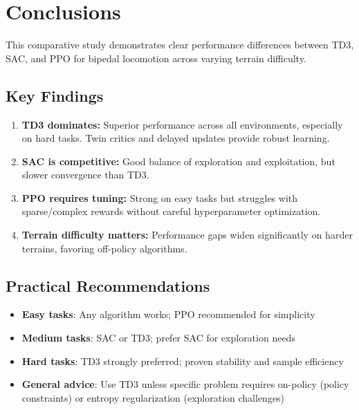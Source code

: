 \documentclass[10pt,a4paper,twocolumn]{article}
\begin{document}
\section{Conclusions}

This comparative study demonstrates clear performance differences between TD3, SAC, and PPO for bipedal locomotion across varying terrain difficulty.

\subsection{Key Findings}

\begin{enumerate}
    \item \textbf{TD3 dominates:} Superior performance across all environments, especially on hard tasks. Twin critics and delayed updates provide robust learning.
    
    \item \textbf{SAC is competitive:} Good balance of exploration and exploitation, but slower convergence than TD3.
    
    \item \textbf{PPO requires tuning:} Strong on easy tasks but struggles with sparse/complex rewards without careful hyperparameter optimization.
    
    \item \textbf{Terrain difficulty matters:} Performance gaps widen significantly on harder terrains, favoring off-policy algorithms.
\end{enumerate}

\subsection{Practical Recommendations}

\begin{itemize}
    \item \textbf{Easy tasks}: Any algorithm works; PPO recommended for simplicity
    \item \textbf{Medium tasks}: SAC or TD3; prefer SAC for exploration needs
    \item \textbf{Hard tasks}: TD3 strongly preferred; proven stability and sample efficiency
    \item \textbf{General advice}: Use TD3 unless specific problem requires on-policy (policy constraints) or entropy regularization (exploration challenges)
\end{itemize}
\end{document}
